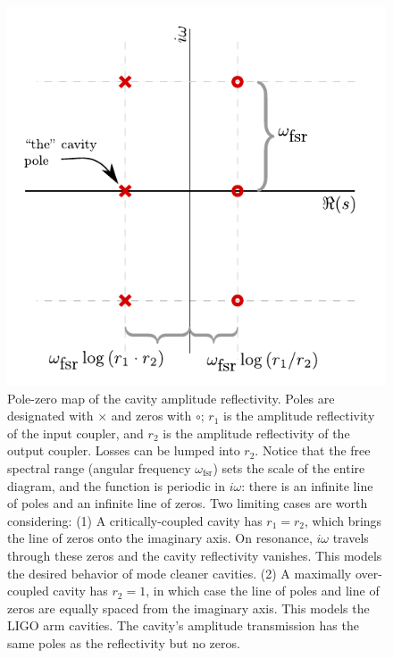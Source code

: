\begin{figure}
\centering\includegraphics{figures/cavitypzmap.pdf}
\caption{\label{fig:cavpzmap} Pole-zero map of the cavity amplitude
  reflectivity.
  Poles are designated with $\times$ and zeros with
  $\circ$; $r_1$ is the amplitude reflectivity of the input coupler,
  and $r_2$ is the amplitude reflectivity of the output coupler.
  Losses can be lumped into $r_2$.  Notice that the free spectral
  range (angular frequency $\omega_{\textrm{fsr}}$) sets the scale of
  the entire diagram, and the function is periodic in $i\omega$: there
  is an infinite line of poles and an infinite line of zeros.  Two
  limiting cases are worth considering: (1) A critically-coupled
  cavity has $r_1=r_2$, which brings the line of zeros onto the
  imaginary axis. On resonance, $i\omega$ travels through these zeros
  and the cavity reflectivity vanishes.  This models the desired
  behavior of mode cleaner cavities. (2) A maximally over-coupled
  cavity has $r_2=1$, in which case the line of poles and line of
  zeros are equally spaced from the imaginary axis.  This models the
  LIGO arm cavities.  
  The cavity's amplitude transmission has the same poles as the
  reflectivity but no zeros.
}
\end{figure}

